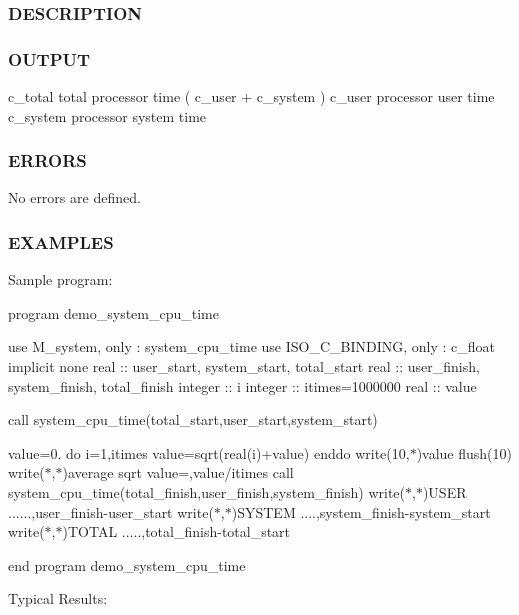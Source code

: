 \subsubsection*{D\+E\+S\+C\+R\+I\+P\+T\+I\+ON}

\subsubsection*{O\+U\+T\+P\+UT}

c\+\_\+total total processor time ( c\+\_\+user + c\+\_\+system ) c\+\_\+user processor user time c\+\_\+system processor system time

\subsubsection*{E\+R\+R\+O\+RS}

No errors are defined.

\subsubsection*{E\+X\+A\+M\+P\+L\+ES}

Sample program\+:

program demo\+\_\+system\+\_\+cpu\+\_\+time

use M\+\_\+system, only \+: system\+\_\+cpu\+\_\+time use I\+S\+O\+\_\+\+C\+\_\+\+B\+I\+N\+D\+I\+NG, only \+: c\+\_\+float implicit none real \+:\+: user\+\_\+start, system\+\_\+start, total\+\_\+start real \+:\+: user\+\_\+finish, system\+\_\+finish, total\+\_\+finish integer \+:\+: i integer \+:\+: itimes=1000000 real \+:\+: value

call system\+\_\+cpu\+\_\+time(total\+\_\+start,user\+\_\+start,system\+\_\+start)

value=0. do i=1,itimes value=sqrt(real(i)+value) enddo write(10,$\ast$)value flush(10) write($\ast$,$\ast$)\textquotesingle{}average sqrt value=\textquotesingle{},value/itimes call system\+\_\+cpu\+\_\+time(total\+\_\+finish,user\+\_\+finish,system\+\_\+finish) write($\ast$,$\ast$)\textquotesingle{}U\+S\+ER ......\textquotesingle{},user\+\_\+finish-\/user\+\_\+start write($\ast$,$\ast$)\textquotesingle{}S\+Y\+S\+T\+EM ....\textquotesingle{},system\+\_\+finish-\/system\+\_\+start write($\ast$,$\ast$)\textquotesingle{}T\+O\+T\+AL .....\textquotesingle{},total\+\_\+finish-\/total\+\_\+start

end program demo\+\_\+system\+\_\+cpu\+\_\+time

Typical Results\+: \mbox{\label{namespacem__system_a744f46033ef5e7ae95ec6cbff3ae3f89}} 
